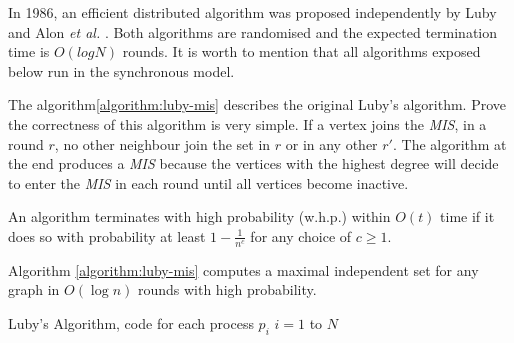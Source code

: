 In 1986, an efficient distributed algorithm was proposed independently by Luby \cite{luby1986simple} and Alon \textit{et al.} \cite{alon1986fast}. Both algorithms are randomised and the expected termination time is $O(log N)$ rounds. It is worth to mention that all algorithms exposed below run in the synchronous model.  

The algorithm\ref{algorithm:luby-mis} describes the original Luby's algorithm. Prove the correctness of this algorithm is very simple. If a vertex joins the \textit{MIS}, in a round $r$, no other neighbour join the set in $r$ or in any other $r\prime$. The algorithm at the end produces a \textit{MIS} because the vertices with the highest degree will decide to enter the \textit{MIS} in each round until all vertices become inactive.

\begin{definition}

An algorithm terminates with high probability (w.h.p.) within $O(t)$ time if it does so with probability at least $1-\frac{1}{n^c}$ for any choice of $c\geq 1$.

\end{definition}


\begin{theorem}

Algorithm \ref{algorithm:luby-mis} computes a maximal independent set for any graph  in $O(\log n)$  rounds with high probability.

\end{theorem}


\begin{algorithm}
 \caption{Luby's Algorithm, code for each process $p_i$ $i = 1$ to $N$}
 \label{algorithm:luby-mis} 

\SetAlgoNoLine
{}
\end{algorithm} 



